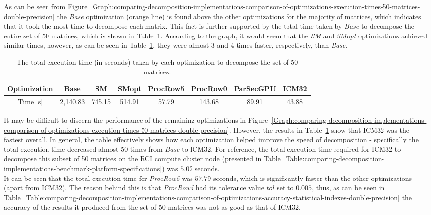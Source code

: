 As can be seen from Figure~\ref{Graph:comparing-decomposition-implementations-comparison-of-optimizations-execution-times-50-matrices-double-precision} the \textit{Base} optimization (orange line) is found above the other optimizations for the majority of matrices, which indicates that it took the most time to decompose each matrix. This fact is further supported by the total time taken by \textit{Base} to decompose the entire set of 50 matrices, which is shown in Table~\ref{Table:comparing-decomposition-implementations-comparison-of-optimizations-total-execution-time}. According to the graph, it would seem that the \textit{SM} and \textit{SMopt} optimizations achieved similar times, however, as can be seen in Table~\ref{Table:comparing-decomposition-implementations-comparison-of-optimizations-total-execution-time}, they were almost 3 and 4 times faster, respectively, than \textit{Base}.

\begin{table}[ht!]
	\centering
	\renewcommand{\arraystretch}{1.5}
	\begin{tabular}{ |c|c|c|c|c|c|c|c| } 
		\hline
		Optimization & Base    & SM     & SMopt & ProcRow5 & ProcRow0 & ParSecGPU & ICM32 \\
		\hline
		Time [s]     & 2,140.83 & 745.15 & 514.91  & 57.79      & 143.68   &  89.91    & 43.88 \\
		\hline
	\end{tabular}
	\caption{The total execution time (in seconds) taken by each optimization to decompose the set of 50 matrices.}
	\label{Table:comparing-decomposition-implementations-comparison-of-optimizations-total-execution-time}
\end{table}

It may be difficult to discern the performance of the remaining optimizations in Figure~\ref{Graph:comparing-decomposition-implementations-comparison-of-optimizations-execution-times-50-matrices-double-precision}. However, the results in Table~\ref{Table:comparing-decomposition-implementations-comparison-of-optimizations-total-execution-time} show that ICM32 was the fastest overall. In general, the table effectively shows how each optimization helped improve the speed of decomposition - specifically the total execution time decreased almost 50 times from \textit{Base} to ICM32. For reference, the total execution time required for ICM32 to decompose this subset of 50 matrices on the RCI compute cluster node (presented in Table~\ref{Table:comparing-decomposition-implementations-benchmark-platform-specifications}) was $ 5.02 $ seconds. \\
It can be seen that the total execution time for \textit{ProcRow5} was $ 57.79 $ seconds, which is significantly faster than the other optimizations (apart from ICM32). The reason behind this is that \textit{ProcRow5} had its tolerance value $ tol $ set to $ 0.005 $, thus, as can be seen in Table~\ref{Table:comparing-decomposition-implementations-comparison-of-optimizations-accuracy-statistical-indexes-double-precision} the accuracy of the results it produced from the set of 50 matrices was not as good as that of ICM32.

